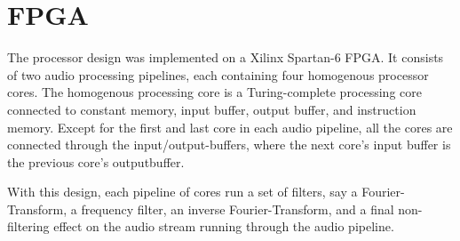 \FloatBarrier
\section{FPGA}\label{chapter:fpga}

The processor design was implemented on a Xilinx Spartan-6 FPGA. It consists of
two audio processing pipelines, each containing four homogenous processor cores.
The homogenous processing core is a Turing-complete processing core connected to
constant memory, input buffer, output buffer, and instruction memory. Except for
the first and last core in each audio pipeline, all the cores are connected
through the input/output-buffers, where the next core's input buffer is the
previous core's outputbuffer.

With this design, each pipeline of cores run a set of filters, say a
Fourier-Transform, a frequency filter, an inverse Fourier-Transform, and a final
non-filtering effect on the audio stream running through the audio pipeline.







